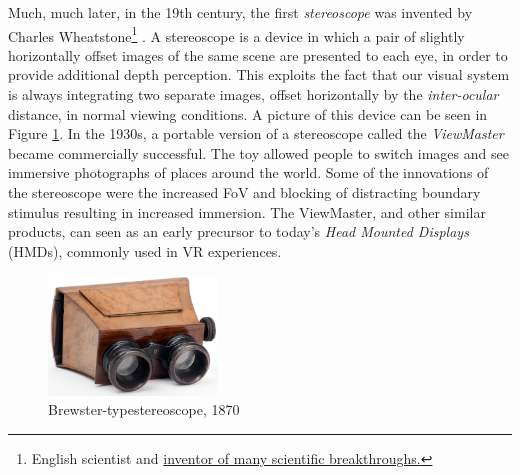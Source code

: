 Much, much later, in the 19th century, the first \textit{stereoscope} was invented by Charles Wheatstone\footnote{English scientist and \href{https://en.wikipedia.org/wiki/Charles_Wheatstone}{inventor of many scientific breakthroughs.}} \cite{hemstrom2020comparison}. A stereoscope is a device in which a pair of slightly horizontally offset images of the same scene are presented to each eye, in order to provide additional depth perception. This exploits the fact that our visual system is always integrating two separate images, offset horizontally by the \textit{inter-ocular} distance, in normal viewing conditions. A picture of this device can be seen in Figure \ref{img:stereoscope}. In the 1930s, a portable version of a stereoscope called the \textit{ViewMaster} became commercially successful. The toy allowed people to switch images and see immersive photographs of places around the world. Some of the innovations of the stereoscope were the increased FoV and blocking of distracting boundary stimulus resulting in increased immersion. The ViewMaster, and other similar products, can seen as an early precursor to today's \textit{Head Mounted Displays} (HMDs), commonly used in VR experiences. 

\begin{figure}[ht!]%
\centering
\includegraphics[width=0.4\textwidth]{img/stereoscope.jpg} 
\caption{Brewster-type\protect\footnotemark stereoscope, 1870 \cite{FileIGB032online}}
\label{img:stereoscope}
\end{figure}


